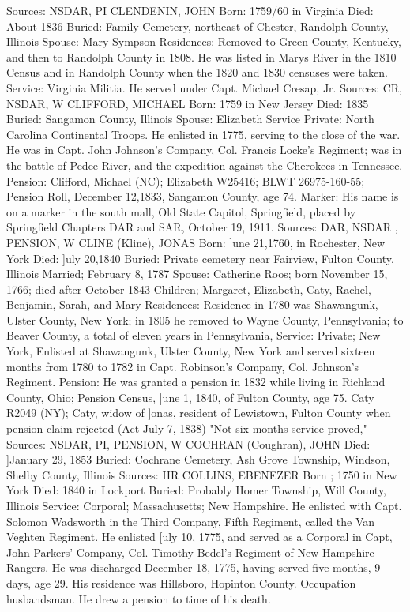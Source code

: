 Sources: NSDAR, PI 
CLENDENIN, JOHN 
Born: 1759/60 in Virginia 
Died: About 1836 
Buried: Family Cemetery, northeast of Chester, Randolph County, Illinois 
Spouse: Mary Sympson 
Residences: Removed to Green County, Kentucky, and then to Randolph County in 1808. He was listed in Marys River in the 1810 Census and in Randolph County when the 1820 and 1830 censuses were taken. 
Service: Virginia Militia. He served under Capt. Michael Cresap, Jr. 
Sources: CR, NSDAR, W 
CLIFFORD, MICHAEL 
Born: 1759 in New Jersey 
Died: 1835 
Buried: Sangamon County, Illinois 
Spouse: Elizabeth Service
Private: North Carolina Continental Troops. He enlisted in 1775, serving to the close of the war. He was in Capt. John Johnson's Company, Col. Francis Locke's Regiment; was in the battle of Pedee River, and the expedi­tion against the Cherokees in Tennessee. 
Pension: Clifford, Michael (NC); Elizabeth W25416; BLWT 26975-160-55; Pension Roll, December 12,1833, Sangamon County, age 74. 
Marker: His name is on a marker in the south mall, Old State Capitol, Spring­field, placed by Springfield Chapters DAR and SAR, October 19, 1911. 
Sources: DAR, NSDAR , PENSION, W 
CLINE (Kline), JONAS 
Born: ]une 21,1760, in Rochester, New York 
Died: ]uly 20,1840 
Buried: Private cemetery near Fairview, Fulton County, Illinois 
Married; February 8, 1787 
Spouse: Catherine Roos; born November 15, 1766; died after October 1843 
Children; Margaret, Elizabeth, Caty, Rachel, Benjamin, Sarah, and Mary 
Residences: Residence in 1780 was Shawangunk, Ulster County, New York; in 1805 he removed to Wayne County, Pennsylvania; to Beaver County, a total of eleven years in Pennsylvania, 
Service: Private; New York, Enlisted at Shawangunk, Ulster County, New York and served sixteen months from 1780 to 1782 in Capt. Robinson's Company, Col. Johnson's Regiment. 
Pension: He was granted a pension in 1832 while living in Richland County, Ohio; Pension Census, ]une 1, 1840, of Fulton County, age 75. Caty R2049 (NY); Caty, widow of ]onas, resident of Lewistown, Fulton County when pension claim rejected (Act July 7, 1838) "Not six months service proved," 
Sources: NSDAR, PI, PENSION, W 
COCHRAN (Coughran), JOHN 
Died: ]January 29, 1853 
Buried: Cochrane Cemetery, Ash Grove Township, Windson, Shelby County, Illinois 
Sources: HR 
COLLINS, EBENEZER 
Born ; 1750 in New York 
Died: 1840 in Lockport 
Buried: Probably Homer Township, Will County, Illinois 
Service: Corporal; Massachusetts; New Hampshire. He enlisted with Capt. Solo­mon Wadsworth in the Third Company, Fifth Regiment, called the Van Veghten Regiment. He enlisted [uly 10, 1775, and served as a Corporal in Capt, John Parkers' Company, Col. Timothy Bedel's Regiment of New Hamp­shire Rangers. He was discharged December 18, 1775, having served five months, 9 days, age 29. His residence was Hillsboro, Hopinton County. Occupation husbandsman. He drew a pension to time of his death. 
